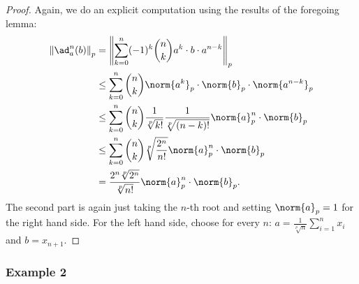 \documentclass[
11pt,                          %
english                        %
]{article}
\begin{document}
\begin{proof}
	Again, we do an explicit computation using the results of the foregoing lemma:
	\begin{align*}
		\left\Vert
			\ad_a^n(b)
		\right\Vert_p
		&=
		\left\Vert
			\sum\limits_{k = 0}^n
			(-1)^k
			\binom{n}{k}
			a^k
			\cdot b \cdot
			a^{n - k}
		\right\Vert_p
		\\
		& \leq
		\sum\limits_{k = 0}^n
		\binom{n}{k}
		\norm{a^k}_p
		\cdot \norm{b}_p \cdot
		\norm{a^{n - k}}_p
		\\
		& \leq
		\sum\limits_{k = 0}^n
		\binom{n}{k}
		\frac{1}{\sqrt[p]{k!}}
		\frac{1}{\sqrt[p]{(n - k)!}}
		\norm{a}_p^n
		\cdot \norm{b}_p
		\\
		& \leq
		\sum\limits_{k = 0}^n
		\binom{n}{k}
		\sqrt[p]{\frac{2^n}{n!}}		
		\norm{a}_p^n
		\cdot \norm{b}_p
		\\
		& =
		\frac{2^n \sqrt[p]{2^n}}{\sqrt[p]{n!}}		
		\norm{a}_p^n
		\cdot \norm{b}_p.
	\end{align*}
	The second part is again just taking the $n$-th root and setting 
	$\norm{a}_p = 1$ for the right hand side. For the left hand side, choose
	for every $n$: $a = \frac{1}{\sqrt[p]{n}} \sum_{i=1}^n x_i$ and $b = x_{n+1}$.
\end{proof}



\subsubsection{Example 2}
\end{document}
